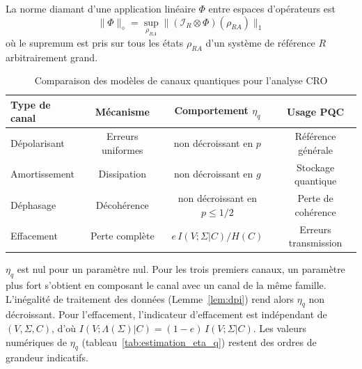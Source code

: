 \begin{sloppypar}
\begin{definition}\label{def:norme_diamant}
La norme diamant d'une application lin\'eaire $\Phi$ entre espaces
d'op\'erateurs est
\begin{equation}
\|\Phi\|_\diamond = \sup_{\rho_{RA}} \|(\mathcal{I}_R \otimes \Phi)(\rho_{RA})\|_1
\end{equation}
o\`u le supremum est pris sur tous les \'etats $\rho_{RA}$ d'un syst\`eme
de r\'ef\'erence $R$ arbitrairement grand.
\end{definition}

\begin{table}[htbp]
\centering
\caption{Comparaison des mod\`eles de canaux quantiques pour l'analyse CRO}
\label{tab:modeles_canaux_quantiques}
\begin{tabular}{@{}lccc@{}}
\toprule
\textbf{Type de canal} & \textbf{M\'ecanisme} & \textbf{Comportement $\eta_q$} & \textbf{Usage PQC} \\
\midrule
D\'epolarisant~\cite{NielsenChuang2010}      & Erreurs uniformes    & non d\'ecroissant en $p$           & R\'ef\'erence g\'en\'erale    \\
Amortissement~\cite{Breuer2002}     & Dissipation         & non d\'ecroissant en $g$ & Stockage quantique   \\
D\'ephasage~\cite{Zurek2003}         & D\'ecoh\'erence      & non d\'ecroissant en $p \leq 1/2$     & Perte de coh\'erence    \\
Effacement~\cite{Grassl1997}        & Perte compl\`ete    & $e\,I(V;\Sigma|C)/H(C)$                 & Erreurs transmission \\
\bottomrule
\end{tabular}
\begin{tablenotes}
\item \footnotesize $\eta_q$ est nul pour un param\`etre nul. Pour les trois premiers
canaux, un param\`etre plus fort s'obtient en composant le canal avec un canal de la
m\^eme famille. L'in\'egalit\'e de traitement des donn\'ees (Lemme~\ref{lem:dpi}) rend
alors $\eta_q$ non d\'ecroissant. Pour l'effacement, l'indicateur d'effacement est
ind\'ependant de $(V,\Sigma,C)$, d'o\`u $I(V;\Lambda(\Sigma)|C) = (1-e)\,I(V;\Sigma|C)$.
Les valeurs num\'eriques de $\eta_q$ (tableau~\ref{tab:estimation_eta_q}) restent des ordres de grandeur indicatifs.
\end{tablenotes}
\end{table}
\end{sloppypar}

